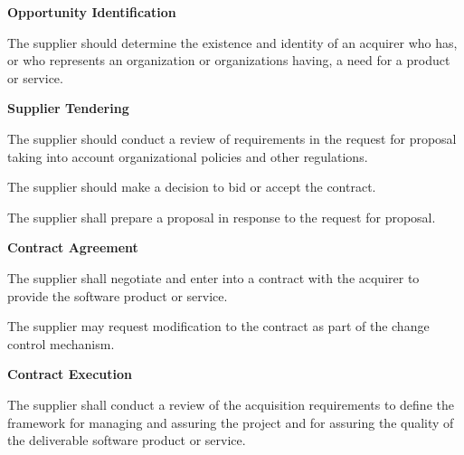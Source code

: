 			\begin{adjustwidth}{2em}{0pt}

				\begin{compactenum}

					\item {\bf Opportunity Identification}
					\begin{compactenum}

						\item The supplier should determine the existence and identity of an acquirer who has, or who represents an organization or organizations having, a need for a product or service.

					\end{compactenum}

					\item {\bf Supplier Tendering}
					\begin{compactenum}
						
						\item The supplier should conduct a review of requirements in the request for proposal taking into account organizational policies and other regulations.

						\item The supplier should make a decision to bid or accept the contract.

						\item The supplier shall prepare a proposal in response to the request for proposal.

					\end{compactenum}

					\item {\bf Contract Agreement}
					\begin{compactenum}

						\item The supplier shall negotiate and enter into a contract with the acquirer to provide the software product or service.

						\item The supplier may request modification to the contract as part of the change control mechanism.

					\end{compactenum}

					\item {\bf Contract Execution}
					\begin{compactenum}

						\item The supplier shall conduct a review of the acquisition requirements to define the framework for managing and assuring the project and for assuring the quality of the deliverable software product or service.


\end{compactenum}
\end{compactenum}
\end{adjustwidth}
